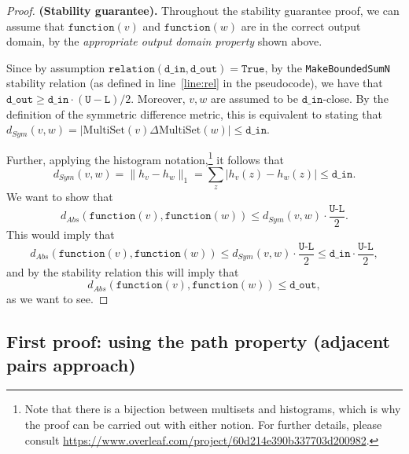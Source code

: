 \documentclass[11pt,a4paper]{article}
\theoremstyle{definition}
\newcommand{\MultiSet}{\mathrm{MultiSet}}
\newcommand{\din}{\texttt{d\_in}}
\newcommand{\dout}{\texttt{d\_out}}
\newcommand{\Relation}{\texttt{relation}}
\newcommand{\U}{\texttt{U}}
\newcommand{\True}{\texttt{True}}
\newcommand{\function}{\texttt{function}}
\begin{document}
\begin{proof}
    \smallskip
    \textbf{(Stability guarantee).} Throughout the stability guarantee proof, we can assume that $\function(v)$ and $\function(w)$ are in the correct output domain, by the \textit{appropriate output domain property} shown above. 
    
    Since by assumption $\Relation(\din, \dout) = \True$, by the \texttt{MakeBoundedSumN} stability relation (as defined in line~\ref{line:rel} in the pseudocode), we have that $\dout \geq \din \cdot (\U - \texttt{L})/2$. Moreover, $v, w$ are assumed to be $\din$-close. By the definition of the symmetric difference metric, this is equivalent to stating that $d_{Sym}(v, w) = |\MultiSet(v) \Delta \MultiSet(w)| \leq \din$.

    Further, applying the histogram notation,\footnote{Note that there is a bijection between multisets and histograms, which is why the proof can be carried out with either notion. For further details, please consult \url{https://www.overleaf.com/project/60d214e390b337703d200982}.}  it follows that
    \[
        d_{Sym}(v, w) = \lVert h_{v} - h_{w}\rVert_1 = \sum_z |h_v(z) - h_w(z)| \leq \din.
    \]
    We want to show that
    \[
        d_{Abs}(\function(v), \function(w)) \leq d_{Sym}(v, w) \cdot \dfrac{\texttt{U-L}}{2}.
    \]
    This would imply that
    \begin{equation}\label{eq:abs1}
        d_{Abs}(\function(v), \function(w)) \leq d_{Sym}(v, w) \cdot \dfrac{\texttt{U-L}}{2} \leq \din \cdot \dfrac{\texttt{U-L}}{2},
    \end{equation}
    and by the stability relation this will imply that
    \begin{equation}\label{eq:abs2}
        d_{Abs}(\function(v), \function(w)) \leq \dout,
    \end{equation}
    as we want to see. 
\end{proof}

\subsection{First proof: using the path property (adjacent pairs approach)}
\end{document}
